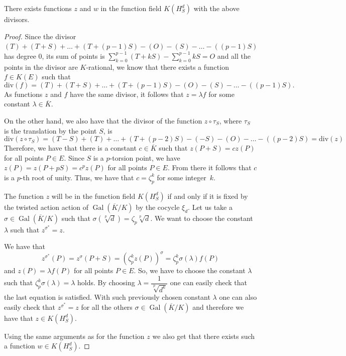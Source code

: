 \documentclass[10pt,a4paper]{amsart}
\newcommand{\GalK}{\operatorname{Gal}(\overline{K}/K)}
\renewcommand{\div}{\mathrm{div}}
\begin{document}
\begin{proposition}\label{prop_zw_def}
    There exists functions $z$ and $w$ in the function field $K(H_S^d)$ with the above divisors.
\end{proposition}

\begin{proof}
    Since the divisor $(T)+(T+S)+\dotso+(T+(p-1)S)-(O)-(S)-\dotso -((p-1)S)$ has  degree $0$, its sum of points is $\displaystyle{\sum_{k=0}^{p-1}(T+kS) - \sum_{k=0}^{p-1}kS = O}$ and all the points in the divisor are $K$-rational, we know that there exists a function $f \in K(E)$ such that
    \[
        \div{(f)} = (T)+(T+S)+\dotso+(T+(p-1)S)-(O)-(S)-\dotso -((p-1)S).
    \]
    As functions $z$ and $f$ have the same divisor, it follows that $z=\lambda f$ for some constant $\lambda \in \overline{K}$.

    On the other hand, we also have that the divisor of the function $z\circ \tau_S$, where $\tau_S$ is the translation by the point $S$, is
    \[
        \div{(z\circ \tau_S)} = (T-S)+(T)+\dotso+(T+(p-2)S)-(-S)-(O)-\dotso -((p-2)S) = \div{(z)}
    \]
    Therefore, we have that there is a constant $c \in \overline{K}$ such that $z(P+S) = c z(P)$ for all points $P\in E$. 
    Since $S$ is a $p$-torsion point, we have $z(P) = z(P+pS)=c^p z(P)$ for all points $P \in E$. From there it follows that $c$ is a $p$-th root of unity. Thus, we have that $c=\zeta_p^k$ for some integer~$k$.

    The function $z$ will be in the function field $K(H_S^d)$ if and only if it is fixed by the twisted action action of $\GalK$ by the cocycle $\xi_d$. Let us take a $\sigma \in \GalK$ such that $\sigma(\sqrt[p]{d}) = \zeta_p \sqrt[p]{d}$. We want to choose the constant $\lambda$ such that $z^{\sigma^*}=z$. 
    
    We have that
    \[
        z^{\sigma^*}(P) = z^\sigma(P+S) = (\zeta_p^k z(P))^\sigma= \zeta_p^k \sigma(\lambda) f(P)
    \]
    and $z(P) = \lambda f(P)$ for all points $P \in E$. So, we have to choose the constant $\lambda$ such that $\zeta_p^k \sigma(\lambda) = \lambda$ holds. By choosing $\lambda = \dfrac{1}{\sqrt[p]{d^k}}$ one can easily check that the last equation is satisfied. With such previously chosen constant $\lambda$ one can also easily check that $z^{\sigma^*}=z$ for all the others $\sigma \in \GalK$ and therefore we have that $z \in K(H_S^d)$. 
    
    Using the same arguments as for the function $z$ we also get that there exists such a function $w \in K(H_S^d)$.
\end{proof}
\end{document}

